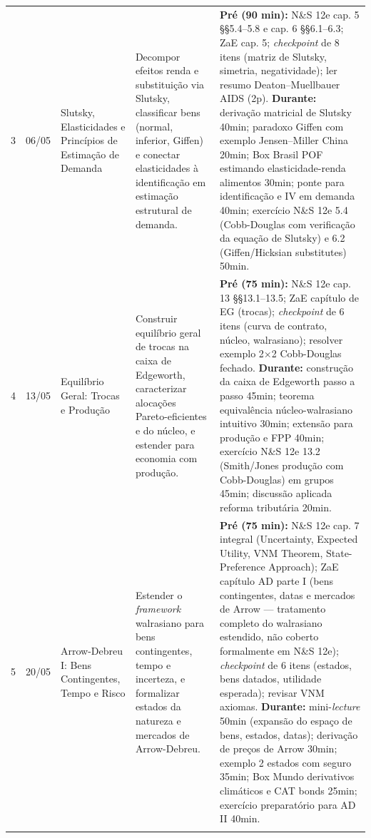 \documentclass[11pt,a4paper]{article}
\newcommand{\zaeshort}{ZaE}
\newcommand{\ns}{N\&S 12e}
\begin{document}
\begin{small}
\begin{longtable}{@{}p{0.9cm}p{1.6cm}p{2.8cm}p{4.2cm}p{4.6cm}@{}}
3 & 06/05 & Slutsky, Elasticidades e Princípios de Estimação de Demanda & Decompor efeitos renda e substituição via Slutsky, classificar bens (normal, inferior, Giffen) e conectar elasticidades à identificação em estimação estrutural de demanda. &
\textbf{Pré (90 min):} \ns{} cap. 5 §§5.4--5.8 e cap. 6 §§6.1--6.3; \zaeshort{} cap. 5; \textit{checkpoint} de 8 itens (matriz de Slutsky, simetria, negatividade); ler resumo Deaton--Muellbauer AIDS (2p).\newline
\textbf{Durante:} derivação matricial de Slutsky 40min; paradoxo Giffen com exemplo Jensen--Miller China 20min; Box Brasil POF estimando elasticidade-renda alimentos 30min; ponte para identificação e IV em demanda 40min; exercício \ns{} 5.4 (Cobb-Douglas com verificação da equação de Slutsky) e 6.2 (Giffen/Hicksian substitutes) 50min. \\
\addlinespace

4 & 13/05 & Equilíbrio Geral: Trocas e Produção & Construir equilíbrio geral de trocas na caixa de Edgeworth, caracterizar alocações Pareto-eficientes e do núcleo, e estender para economia com produção. &
\textbf{Pré (75 min):} \ns{} cap. 13 §§13.1--13.5; \zaeshort{} capítulo de EG (trocas); \textit{checkpoint} de 6 itens (curva de contrato, núcleo, walrasiano); resolver exemplo 2$\times$2 Cobb-Douglas fechado.\newline
\textbf{Durante:} construção da caixa de Edgeworth passo a passo 45min; teorema equivalência núcleo-walrasiano intuitivo 30min; extensão para produção e FPP 40min; exercício \ns{} 13.2 (Smith/Jones produção com Cobb-Douglas) em grupos 45min; discussão aplicada reforma tributária 20min. \\
\addlinespace

5 & 20/05 & Arrow-Debreu I: Bens Contingentes, Tempo e Risco & Estender o \textit{framework} walrasiano para bens contingentes, tempo e incerteza, e formalizar estados da natureza e mercados de Arrow-Debreu. &
\textbf{Pré (75 min):} \ns{} cap. 7 integral (Uncertainty, Expected Utility, VNM Theorem, State-Preference Approach); \zaeshort{} capítulo AD parte I (bens contingentes, datas e mercados de Arrow --- tratamento completo do walrasiano estendido, não coberto formalmente em \ns{}); \textit{checkpoint} de 6 itens (estados, bens datados, utilidade esperada); revisar VNM axiomas.\newline
\textbf{Durante:} mini-\textit{lecture} 50min (expansão do espaço de bens, estados, datas); derivação de preços de Arrow 30min; exemplo 2 estados com seguro 35min; Box Mundo derivativos climáticos e CAT bonds 25min; exercício preparatório para AD II 40min. \\
\addlinespace


\end{longtable}
\end{small}
\end{document}
